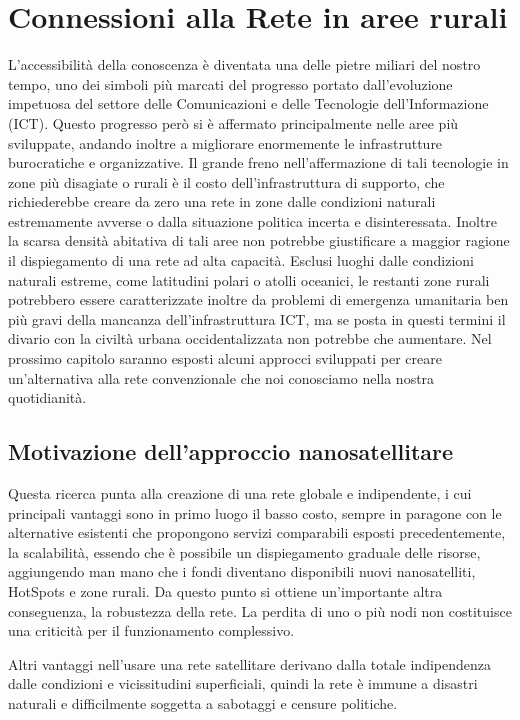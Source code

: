 \documentclass[12pt,a4paper,oneside]{book}
\begin{document}
		
		\section{Connessioni alla Rete in aree rurali}
			
		L'accessibilità della conoscenza è diventata una delle pietre miliari del nostro tempo, uno dei simboli più marcati del progresso portato dall'evoluzione impetuosa del settore delle Comunicazioni e delle Tecnologie dell'Informazione (ICT). Questo progresso però si è affermato principalmente nelle aree più sviluppate, andando inoltre a migliorare enormemente le infrastrutture burocratiche e organizzative. Il grande freno nell'affermazione di tali tecnologie in zone più disagiate o rurali è il costo dell'infrastruttura di supporto, che richiederebbe creare da zero una rete in zone dalle condizioni naturali estremamente avverse o dalla situazione politica incerta e disinteressata. Inoltre la scarsa densità abitativa di tali aree non potrebbe giustificare a maggior ragione il dispiegamento di una rete ad alta capacità. Esclusi luoghi dalle condizioni naturali estreme, come latitudini polari o atolli oceanici, le restanti zone rurali potrebbero essere caratterizzate inoltre da problemi di emergenza umanitaria ben più gravi della mancanza dell'infrastruttura ICT, ma se posta in questi termini il divario con la civiltà urbana occidentalizzata non potrebbe che aumentare. Nel prossimo capitolo saranno esposti alcuni approcci sviluppati per creare un'alternativa alla rete convenzionale che noi conosciamo nella nostra quotidianità.
			
				\subsection{Motivazione dell'approccio nanosatellitare}			
					
				Questa ricerca punta alla creazione di una rete globale e indipendente, i cui principali vantaggi sono in primo luogo il basso costo, sempre in paragone con le alternative esistenti che propongono servizi comparabili esposti precedentemente, la scalabilità, essendo che è possibile un dispiegamento graduale delle risorse, aggiungendo man mano che i fondi diventano disponibili nuovi nanosatelliti, HotSpots e zone rurali. Da questo punto si ottiene un'importante altra conseguenza, la robustezza della rete. La perdita di uno o più nodi non costituisce una criticità per il funzionamento complessivo. 
					
				Altri vantaggi nell'usare una rete satellitare derivano dalla totale indipendenza dalle condizioni e vicissitudini superficiali, quindi la rete è immune a disastri naturali e difficilmente soggetta a sabotaggi e censure politiche.
					
\end{document}
